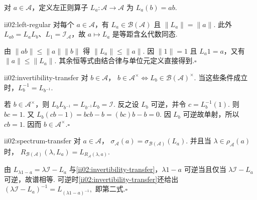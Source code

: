 对 \(\displaystyle a\in\mathcal A\)，定义左正则算子 \(\displaystyle L_a:\mathcal A\to\mathcal A\) 为 \(\displaystyle L_a(b)=ab\).

\begin{FAProposition}[B][左正则表示]{ii02:left-regular}
对每个 \(\displaystyle a\in\mathcal A\)，有 \(\displaystyle L_a\in\mathcal B(\mathcal A)\) 且 \(\displaystyle\|L_a\|=\|a\|\). 此外 \(\displaystyle L_{ab}=L_aL_b\)、\(\displaystyle L_1=\mathcal I_{\mathcal A}\)，故 \(\displaystyle a\mapsto L_a\) 是等距含幺代数同态.
\end{FAProposition}

\begin{FAProof}
由 \(\displaystyle\|ab\|\leqslant\|a\|\|b\|\) 得 \(\displaystyle\|L_a\|\leqslant\|a\|\). 因 \(\displaystyle\|1\|=1\) 且 \(\displaystyle L_a1=a\)，又有 \(\displaystyle\|a\|\leqslant\|L_a\|\). 其余恒等式由结合律与单位元定义直接得到.\hfill\(\square\)
\end{FAProof}

\begin{FALemma}[B][代数可逆性与算子可逆性的等价]{ii02:invertibility-transfer}
对 \(\displaystyle b\in\mathcal A\)，
\(\displaystyle b\in\mathcal A^\times \Longleftrightarrow L_b\in\mathcal B(\mathcal A)^\times.\)
当这些条件成立时，\(\displaystyle L_b^{-1}=L_{b^{-1}}\).
\end{FALemma}

\begin{FAProof}
若 \(\displaystyle b\in\mathcal A^\times\)，则 \(\displaystyle L_bL_{b^{-1}}=L_{b^{-1}}L_b=\mathcal I\). 反之设 \(\displaystyle L_b\) 可逆，并令 \(\displaystyle c=L_b^{-1}(1)\). 则 \(\displaystyle bc=1\). 又
\(\displaystyle L_b(cb-1)=bcb-b=(bc)b-b=0.\)
因 \(\displaystyle L_b\) 可逆故单射，所以 \(\displaystyle cb=1\). 因而 \(\displaystyle b\in\mathcal A^\times\).\hfill\(\square\)
\end{FAProof}

\begin{FAProposition}[B][代数谱与左正则算子谱的转移]{ii02:spectrum-transfer}
对 \(\displaystyle a\in\mathcal A\)，
\(\displaystyle \sigma_{\mathcal A}(a) = \sigma_{\mathcal B(\mathcal A)}(L_a).\)
并且当 \(\displaystyle\lambda\in\rho_{\mathcal A}(a)\) 时，
\(\displaystyle R_{\mathcal B(\mathcal A)}(\lambda,L_a) = L_{R_{\mathcal A}(\lambda,a)}.\)
\end{FAProposition}

\begin{FAProof}
由 \(\displaystyle L_{\lambda1-a}=\lambda\mathcal I-L_a\) 与\autoref{ii02:invertibility-transfer}，\(\displaystyle\lambda1-a\) 可逆当且仅当 \(\displaystyle\lambda\mathcal I-L_a\) 可逆，故谱相等. 可逆时\autoref{ii02:invertibility-transfer}还给出
\(\displaystyle (\lambda\mathcal I-L_a)^{-1} = L_{(\lambda1-a)^{-1}},\)
即第二式.\hfill\(\square\)
\end{FAProof}

